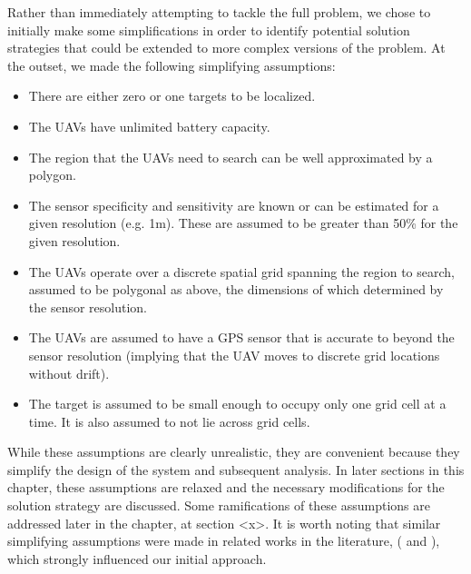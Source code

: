 Rather than immediately attempting to tackle the full problem, we chose to initially make some simplifications in order to identify potential solution strategies that could be extended to more complex versions of the problem. At the outset, we made the following simplifying assumptions:
\begin{itemize}
    \item There are either zero or one targets to be localized.
    \item The UAVs have unlimited battery capacity.
    \item The region that the UAVs need to search can be well approximated by a polygon.
    \item The sensor specificity and sensitivity are known or can be estimated for a given resolution (e.g. 1m). These are assumed to be greater than 50\% for the given resolution.
    \item The UAVs operate over a discrete spatial grid spanning the region to search, assumed to be polygonal as above, the dimensions of which determined by the sensor resolution.
    \item The UAVs are assumed to have a GPS sensor that is accurate to beyond the sensor resolution (implying that the UAV moves to discrete grid locations without drift).
    \item The target is assumed to be small enough to occupy only one grid cell at a time. It is also assumed to not lie across grid cells.
\end{itemize}
While these assumptions are clearly unrealistic, they are convenient because they simplify the design of the system and subsequent analysis. In later sections in this chapter, these assumptions are relaxed and the necessary modifications for the solution strategy are discussed. Some ramifications of these assumptions are addressed later in the chapter, at section <x>. It is worth noting that similar simplifying assumptions were made in related works in the literature, 
(\cite{Chung2007ASearch} and \cite{Waharte2010SupportingUAVs}), %
which strongly influenced our initial approach.

